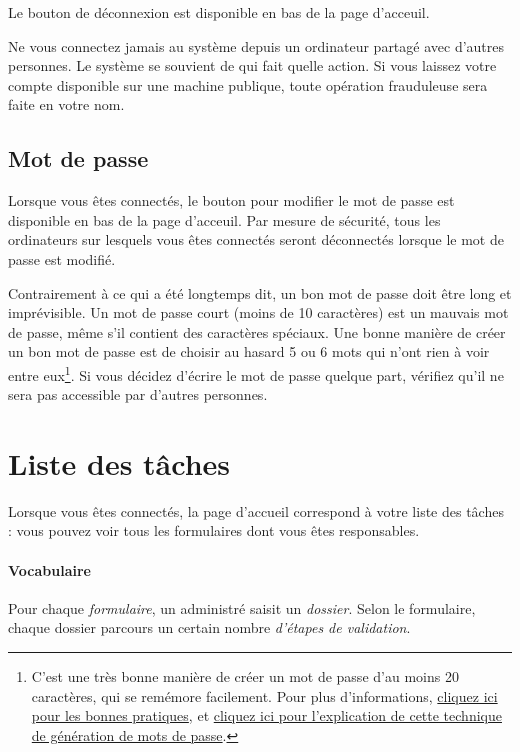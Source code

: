 \documentclass[11pt,french]{memoir}
\begin{document}
	\uparagraph
	Le bouton de déconnexion est disponible en bas de la page d'acceuil.

	Ne vous connectez jamais au système depuis un ordinateur partagé avec d'autres personnes.
	Le système se souvient de qui fait quelle action.
	Si vous laissez votre compte disponible sur une machine publique, toute opération frauduleuse sera faite en votre nom.

	\subsection{Mot de passe}\label{subsec:password}

	Lorsque vous êtes connectés, le bouton pour modifier le mot de passe est disponible en bas de la page d'acceuil.
	Par mesure de sécurité, tous les ordinateurs sur lesquels vous êtes connectés seront déconnectés lorsque le mot de passe est modifié.

	Contrairement à ce qui a été longtemps dit, un bon mot de passe doit être long et imprévisible.
	Un mot de passe court (moins de 10 caractères) est un mauvais mot de passe, même s'il contient des caractères spéciaux.
	Une bonne manière de créer un bon mot de passe est de choisir au hasard 5 ou 6 mots qui n'ont rien à voir entre eux\footnote{C'est une très bonne manière de créer un mot de passe d'au moins 20 caractères, qui se remémore facilement. Pour plus d'informations, \href{https://fr.wikipedia.org/wiki/Robustesse_d\%27un_mot_de_passe}{cliquez ici pour les bonnes pratiques}, et \href{https://fr.wikipedia.org/wiki/Diceware}{cliquez ici pour l'explication de cette technique de génération de mots de passe}.}.
	Si vous décidez d'écrire le mot de passe quelque part, vérifiez qu'il ne sera pas accessible par d'autres personnes.


	\section{Liste des tâches}\label{sec:review}

	Lorsque vous êtes connectés, la page d'accueil correspond à votre liste des tâches : vous pouvez voir tous les formulaires dont vous êtes responsables.

	\paragraph{Vocabulaire}
	Pour chaque \emph{formulaire}, un administré saisit un \emph{dossier}.
	Selon le formulaire, chaque dossier parcours un certain nombre \emph{d'étapes de validation}.
\end{document}

